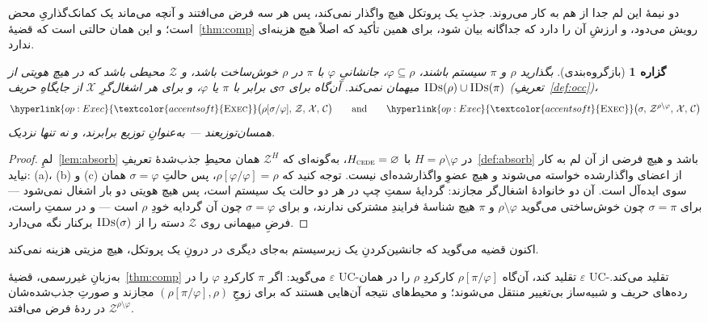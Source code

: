 \documentclass[10pt,oneside,openany]{book}
\renewcommand{\emptyset}{\varnothing}
\newcommand{\Corr}{\mathcal{C}}
\newcommand{\Zenv}{\mathcal{Z}}
\newcommand{\op}[1]{\textnormal{\textsc{#1}}}
\newcommand{\opl}[1]{\hyperlink{op:#1}{\textcolor{accentsoft}{\op{#1}}}}
\newcommand{\IDs}{\op{IDs}}
\theoremstyle{accentdef}
\theoremstyle{accentplain}
\newtheorem{proposition}[definition]{گزاره}
\begin{document}
دو نیمهٔ این لم جدا از هم به کار می‌روند. جذبِ یک پروتکل هیچ واگذار
نمی‌کند، پس هر سه فرض می‌افتند و آنچه می‌ماند یک کمانک‌گذاریِ محض است؛ و
این همان حالتی است که قضیهٔ~\ref{thm:comp} رویش می‌دود، و ارزشِ آن را
دارد که جداگانه بیان شود، برای همین تأکید که اصلاً هیچ هزینه‌ای ندارد.

\begin{proposition}[بازگروه‌بندی]\label{prop:regroup}
بگذارید $\rho$ و $\pi$ سیستم باشند، $\varphi \subseteq \rho$، جانشانیِ
$\varphi$ با $\pi$ در $\rho$ خوش‌ساخت باشد، و $\Zenv$ محیطی باشد که در هیچ
هویتی از $\IDs(\rho) \cup \IDs(\pi)$ میهمان نمی‌کند. آن‌گاه برای $\sigma$ی
برابر با $\pi$ یا $\varphi$، و برای هر اشغال‌گرِ $\mathcal{X}$ از جایگاهِ
حریف (تعریفِ~\ref{def:occ})،
\[
  \opl{Exec}\bigl(\rho[\sigma/\varphi],\,\Zenv,\,\mathcal{X},\,\Corr\bigr)
  \qquad\text{and}\qquad
  \opl{Exec}\bigl(\sigma,\,\Zenv^{\rho \setminus \varphi},\,\mathcal{X},\,\Corr\bigr)
\]
همسان‌توزیعند --- به‌عنوانِ توزیع برابرند، و نه تنها نزدیک.
\end{proposition}

\begin{proof}
لمِ~\ref{lem:absorb} در $H = \rho \setminus \varphi$ با $H_{\op{cede}} =
\emptyset$، به‌گونه‌ای که $\Zenv^{H}$ همان محیطِ جذب‌شدهٔ
تعریفِ~\ref{def:absorb} باشد و هیچ فرضی از آن لم به کار نیاید: (a)، (b) و
(c) از اعضای واگذارشده خواسته می‌شوند و هیچ عضوِ واگذارشده‌ای نیست. توجه
کنید که $\rho[\varphi/\varphi] = \rho$، پس حالتِ $\sigma = \varphi$ همان
سوی ایده‌آل است. آن دو خانوادهٔ اشغال‌گر مجازند: گردایهٔ سمتِ چپ در هر دو
حالت یک سیستم است، پس هیچ هویتی دو بار اشغال نمی‌شود --- برای $\sigma =
\pi$ چون خوش‌ساختی می‌گوید $\rho \setminus \varphi$ و $\pi$ هیچ شناسهٔ
فرایندِ مشترکی ندارند، و برای $\sigma = \varphi$ چون آن گردایه خودِ $\rho$
است --- و در سمتِ راست، فرضِ میهمانی روی $\Zenv$ دسته را از $\IDs(\sigma)$
برکنار نگه می‌دارد.
\end{proof}

اکنون قضیه می‌گوید که جانشین‌کردنِ یک زیرسیستم به‌جای دیگری در درونِ یک
پروتکل، هیچ مزیتی هزینه نمی‌کند.

به‌زبانِ غیررسمی، قضیهٔ~\ref{thm:comp} می‌گوید: اگر $\pi$ کارکردِ $\varphi$
را در $\varepsilon$ UC-تقلید کند، آن‌گاه $\rho[\pi/\varphi]$ کارکردِ $\rho$
را در همان $\varepsilon$ UC-تقلید می‌کند. رده‌های حریف و شبیه‌ساز
بی‌تغییر منتقل می‌شوند؛ و محیط‌های نتیجه آن‌هایی هستند که برای زوجِ
$(\rho[\pi/\varphi],\rho)$ مجازند و صورتِ جذب‌شده‌شان $\Zenv^{\rho
\setminus \varphi}$ در ردهٔ فرض می‌افتد.
\end{document}
